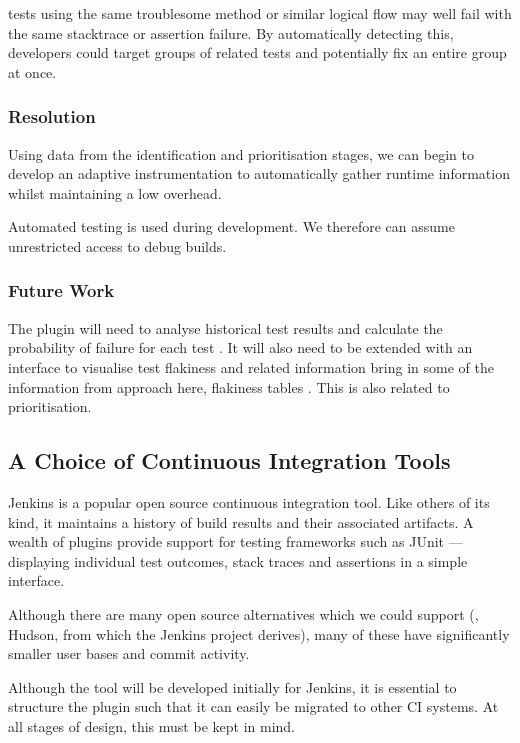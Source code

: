 \Flaky tests using the same troublesome method or similar logical flow may well
fail with the same stacktrace or assertion failure. By automatically detecting
this, developers could target groups of related tests and potentially fix an
entire group at once.

\subsubsection{Resolution}

Using data from the identification and prioritisation stages, we can begin to
develop an adaptive instrumentation to automatically gather runtime information
whilst maintaining a low overhead.

Automated testing is used during development. We therefore can assume
unrestricted access to debug builds.

\subsubsection{Future Work}

The plugin will need to analyse historical test results and calculate the
probability of failure for each test . It will
also need to be extended with an interface to visualise test flakiness and
related information {\todo bring in some of the information from approach here,
flakiness tables \etc}. This is also related to prioritisation.


\subsection{A Choice of Continuous Integration Tools}

Jenkins \cite{Jenkins} is a popular open source continuous integration tool.
Like others of its kind, it maintains a history of build results and their
associated artifacts. A wealth of plugins provide support for testing frameworks
such as JUnit --- displaying individual test outcomes, stack traces and
assertions in a simple interface.

Although there are many open source alternatives which we could support (\eg,
Hudson, from which the Jenkins project derives), many of these have
significantly smaller user bases and commit activity.

Although the tool will be developed initially for Jenkins, it is essential to
structure the plugin such that it can easily be migrated to other CI systems. At
all stages of design, this must be kept in mind.
